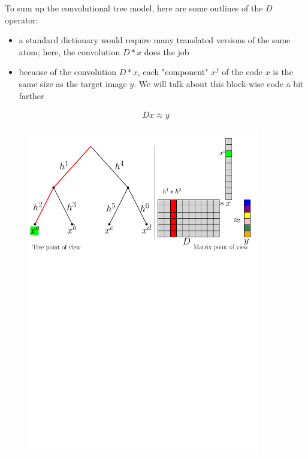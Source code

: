 To sum up the convolutional tree model, here are some outlines of the $D$ operator:
\begin{itemize}
\item a standard dictionary would require many translated versions of the same atom; here, the convolution $D*x$ does the job 
\item because of the convolution $D*x$, each "component" $x^f$ of the code $x$ is the same size as the target image $y$. We will talk about this block-wise code a bit farther
\end{itemize}


\begin{equation*} \begin{aligned}
Dx \approx y
\end{aligned} \end{equation*}


\begin{figure}[!h] \centering
\includegraphics[width=0.9\textwidth]{figures/matrix-vs-tree.pdf} \label{matrix_vs_tree}
\end{figure}



